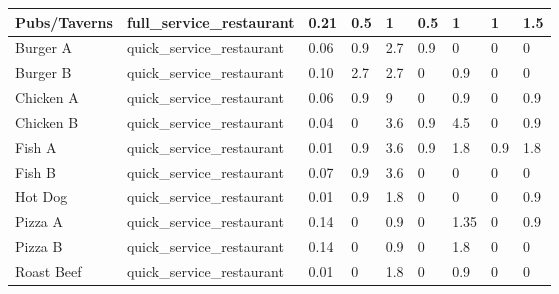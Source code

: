 \begin{table}[]
\begin{tabular}{|l|l|l|l|l|l|l|l|l|}
    Pubs/Taverns             & full\_service\_restaurant       & 0.21                               & 0.5              & 1              & 0.5              & 1             & 1              & 1.5              \\ \hline
    Burger A                 & quick\_service\_restaurant      & 0.06                               & 0.9              & 2.7            & 0.9              & 0             & 0              & 0                \\ \hline
    Burger B                 & quick\_service\_restaurant      & 0.10                               & 2.7              & 2.7            & 0                & 0.9           & 0              & 0                \\ \hline
    Chicken A                & quick\_service\_restaurant      & 0.06                               & 0.9              & 9              & 0                & 0.9           & 0              & 0.9              \\ \hline
    Chicken B                & quick\_service\_restaurant      & 0.04                               & 0                & 3.6            & 0.9              & 4.5           & 0              & 0.9              \\ \hline
    Fish A                   & quick\_service\_restaurant      & 0.01                               & 0.9              & 3.6            & 0.9              & 1.8           & 0.9            & 1.8              \\ \hline
    Fish B                   & quick\_service\_restaurant      & 0.07                               & 0.9              & 3.6            & 0                & 0             & 0              & 0                \\ \hline
    Hot Dog                  & quick\_service\_restaurant      & 0.01                               & 0.9              & 1.8            & 0                & 0             & 0              & 0.9              \\ \hline
    Pizza A                  & quick\_service\_restaurant      & 0.14                               & 0                & 0.9            & 0                & 1.35          & 0              & 0.9              \\ \hline
    Pizza B                  & quick\_service\_restaurant      & 0.14                               & 0                & 0.9            & 0                & 1.8           & 0              & 0                \\ \hline
    Roast Beef               & quick\_service\_restaurant      & 0.01                               & 0                & 1.8            & 0                & 0.9           & 0              & 0                \\ \hline

\end{tabular}
\end{table}
